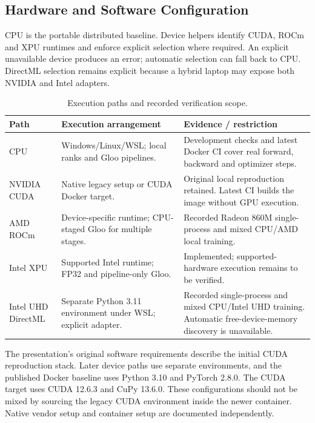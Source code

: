 \subsection{Hardware and Software Configuration}

CPU is the portable distributed baseline. Device helpers identify CUDA, ROCm and XPU runtimes and enforce explicit selection where required. An explicit unavailable device produces an error; automatic selection can fall back to CPU. DirectML selection remains explicit because a hybrid laptop may expose both NVIDIA and Intel adapters.

\begin{table}[H]
\centering\small
\caption{Execution paths and recorded verification scope.}
\begin{tabularx}{\textwidth}{P{2.05cm}YY}
\toprule
\textbf{Path} & \textbf{Execution arrangement} & \textbf{Evidence / restriction}\\
\midrule
CPU & Windows/Linux/WSL; local ranks and Gloo pipelines. & Development checks and latest Docker CI cover real forward, backward and optimizer steps.\\
NVIDIA CUDA & Native legacy setup or CUDA Docker target. & Original local reproduction retained. Latest CI builds the image without GPU execution.\\
AMD ROCm & Device-specific runtime; CPU-staged Gloo for multiple stages. & Recorded Radeon 860M single-process and mixed CPU/AMD local training.\\
Intel XPU & Supported Intel runtime; FP32 and pipeline-only Gloo. & Implemented; supported-hardware execution remains to be verified.\\
Intel UHD DirectML & Separate Python 3.11 environment under WSL; explicit adapter. & Recorded single-process and mixed CPU/Intel UHD training. Automatic free-device-memory discovery is unavailable.\\
\bottomrule
\end{tabularx}
\end{table}

The presentation's original software requirements describe the initial CUDA reproduction stack. Later device paths use separate environments, and the published Docker baseline uses Python 3.10 and PyTorch 2.8.0. The CUDA target uses CUDA 12.6.3 and CuPy 13.6.0. These configurations should not be mixed by sourcing the legacy CUDA environment inside the newer container. Native vendor setup and container setup are documented independently.

